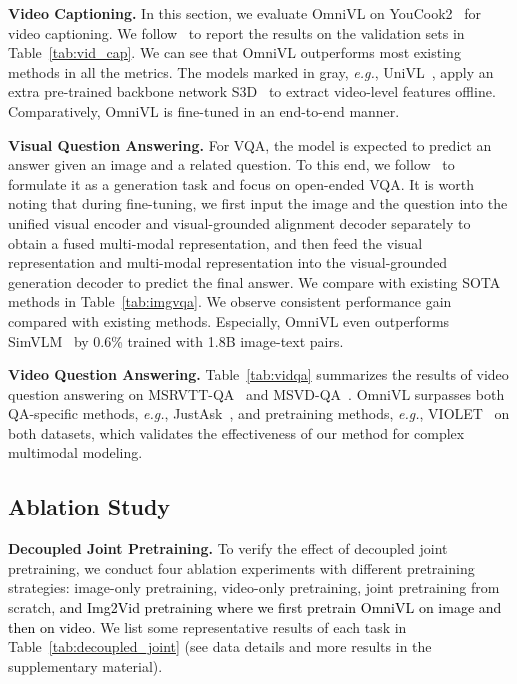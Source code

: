 \documentclass{article}
\makeatletter
\newcommand*{\system}{OmniVL\@\xspace}
\newcommand*{\eg}{\emph{e.g.}\@\xspace}
\newcommand{\red}[1]{\textcolor{black}{#1}}
\makeatother
\begin{document}
\noindent \textbf{Video Captioning.} In this section, we evaluate \system on YouCook2~\cite{zhou2018towards} for video captioning. We follow~\cite{zhou2018end} to report the results on the validation sets in Table~\ref{tab:vid_cap}. We can see that \system outperforms most existing methods in all the metrics. The models marked in gray, \eg, UniVL~\cite{luo2020univl}, apply an extra pre-trained backbone network S3D~\cite{xie2018rethinking} to extract video-level features offline. Comparatively, \system is fine-tuned in an end-to-end manner.


\noindent \textbf{Visual Question Answering.} For VQA, the model is expected to predict an answer given an image and a related question. To this end, we follow~\cite{li2021align,li2022blip} to formulate it as a generation task and focus on open-ended VQA. It is worth noting that during fine-tuning, we first input the image and the question into the unified visual encoder and visual-grounded alignment decoder separately to obtain a fused multi-modal representation, and then feed the visual representation and multi-modal representation into the visual-grounded generation decoder to predict the final answer. We compare with existing SOTA methods in Table~\ref{tab:imgvqa}. We observe consistent performance gain compared with existing methods. Especially, \system even outperforms SimVLM~\cite{wang2022simvlm} by 0.6\% trained with 1.8B image-text pairs.


\noindent \textbf{Video Question Answering.} Table~\ref{tab:vidqa} summarizes the results of video question answering on MSRVTT-QA~\cite{xu2017video} and MSVD-QA~\cite{xu2017video}. \system surpasses both QA-specific methods, \eg, JustAsk~\cite{yang2021just}, and pretraining methods, \eg, VIOLET~\cite{fu2021violet} on both datasets, which validates the effectiveness of our method for complex multimodal modeling. 

\subsection{Ablation Study}
\noindent \textbf{Decoupled Joint Pretraining.} To verify the effect of decoupled joint pretraining, we conduct four ablation experiments with different pretraining strategies: image-only pretraining, video-only pretraining, joint pretraining from scratch, \red{and Img2Vid pretraining where we first pretrain \system on image and then on video}. We list some representative results of each task in Table~\ref{tab:decoupled_joint} (see data details and more results in the supplementary material). 
\end{document}
